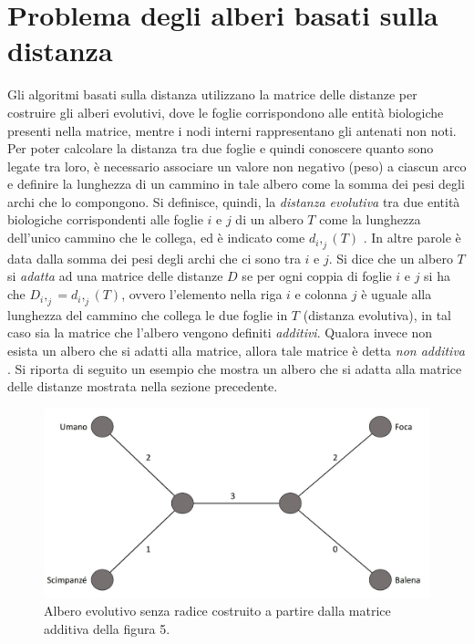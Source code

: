 \section{Problema degli alberi basati sulla distanza}
Gli algoritmi basati sulla distanza utilizzano la matrice delle distanze per costruire gli alberi evolutivi, dove le foglie corrispondono alle entità biologiche presenti nella matrice, mentre i nodi interni rappresentano gli antenati non noti. Per poter calcolare la distanza tra due foglie e quindi conoscere quanto sono legate tra loro, è necessario associare un valore non negativo (peso) a ciascun arco e definire la lunghezza di un cammino in tale albero come la somma dei pesi degli archi che lo compongono. Si definisce, quindi, la \textit{distanza evolutiva} tra due entità biologiche corrispondenti alle foglie $i$ e $j$ di un albero $T$ come la lunghezza dell'unico cammino che le collega, ed è indicato come $d_i,_j(T)$ \cite{bioinfalganactivelearningapproachparttwo}. In altre parole è data dalla somma dei pesi degli archi che ci sono tra $i$ e $j$.
\newline
Si dice che un albero $T$ si \textit{adatta} ad una matrice delle distanze $D$ se per ogni coppia di foglie $i$ e $j$ si ha che $D_i,_j=d_i,_j(T)$, ovvero l'elemento nella riga $i$ e colonna $j$ è uguale alla lunghezza del cammino che collega le due foglie in $T$ (distanza evolutiva), in tal caso sia la matrice che l'albero vengono definiti \textit{additivi}. Qualora invece non esista un albero che si adatti alla matrice, allora tale matrice è detta \textit{non additiva} \cite{bioinfalganactivelearningapproachparttwo}.
\newline
Si riporta di seguito un esempio che mostra un albero che si adatta alla matrice delle distanze mostrata nella sezione precedente.
\begin{figure}[h!]
	\includegraphics[width=\linewidth]{unrooted_tree_created_by_figure_5.jpg}
 	\caption{Albero evolutivo senza radice costruito a partire dalla matrice additiva della figura 5.}
  	\label{fig:EvolutionaryTreeExample}
\end{figure}
